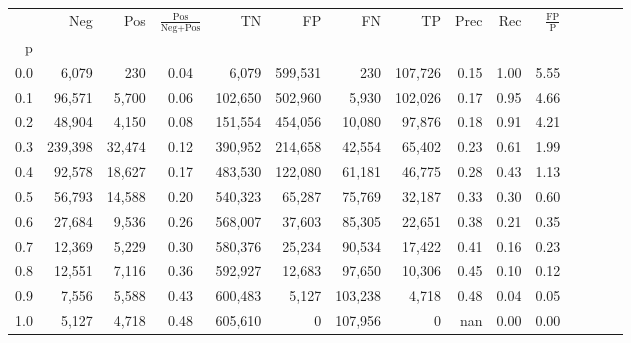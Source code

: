 \begin{tabular}{rrrcrrrrrrrrrrr}
\toprule
{} &      Neg &     Pos & $\frac{\text{Pos}}{\text{Neg}+\text{Pos}}$ &       TN &       FP &       FN &       TP &  Prec &   Rec & $\frac{\text{FP}}{\text{P}}$ \\
p   &          &         &                                            &          &          &          &          &       &       &                              \\
\midrule
0.0 &    6,079 &     230 &                                       0.04 &    6,079 &  599,531 &      230 &  107,726 &  0.15 &  1.00 &                         5.55 \\
0.1 &   96,571 &   5,700 &                                       0.06 &  102,650 &  502,960 &    5,930 &  102,026 &  0.17 &  0.95 &                         4.66 \\
0.2 &   48,904 &   4,150 &                                       0.08 &  151,554 &  454,056 &   10,080 &   97,876 &  0.18 &  0.91 &                         4.21 \\
0.3 &  239,398 &  32,474 &                                       0.12 &  390,952 &  214,658 &   42,554 &   65,402 &  0.23 &  0.61 &                         1.99 \\
0.4 &   92,578 &  18,627 &                                       0.17 &  483,530 &  122,080 &   61,181 &   46,775 &  0.28 &  0.43 &                         1.13 \\
0.5 &   56,793 &  14,588 &                                       0.20 &  540,323 &   65,287 &   75,769 &   32,187 &  0.33 &  0.30 &                         0.60 \\
0.6 &   27,684 &   9,536 &                                       0.26 &  568,007 &   37,603 &   85,305 &   22,651 &  0.38 &  0.21 &                         0.35 \\
0.7 &   12,369 &   5,229 &                                       0.30 &  580,376 &   25,234 &   90,534 &   17,422 &  0.41 &  0.16 &                         0.23 \\
0.8 &   12,551 &   7,116 &                                       0.36 &  592,927 &   12,683 &   97,650 &   10,306 &  0.45 &  0.10 &                         0.12 \\
0.9 &    7,556 &   5,588 &                                       0.43 &  600,483 &    5,127 &  103,238 &    4,718 &  0.48 &  0.04 &                         0.05 \\
1.0 &    5,127 &   4,718 &                                       0.48 &  605,610 &        0 &  107,956 &        0 &   nan &  0.00 &                         0.00 \\
\bottomrule
\end{tabular}

